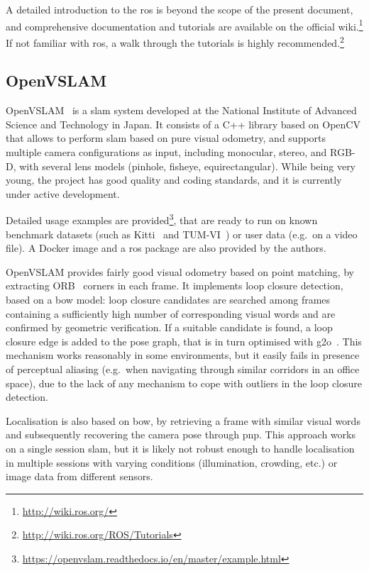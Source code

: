 \documentclass[11pt, letterpaper, twoside]{article}
\begin{document}
A detailed introduction to the \gls{ros} is beyond the scope of the present
document, and comprehensive documentation and tutorials are available on the
official wiki.\footnote{\url{http://wiki.ros.org/}} If not familiar with
\gls{ros}, a walk through the tutorials is highly
recommended.\footnote{\url{http://wiki.ros.org/ROS/Tutorials}}

\subsection{OpenVSLAM}

OpenVSLAM~\cite{openvslam2019} is a \gls{slam} system developed at the National
Institute of Advanced Science and Technology in Japan. It consists of a C++
library based on OpenCV that allows to perform \gls{slam} based on pure visual
odometry, and supports multiple camera configurations as input, including
monocular, stereo, and RGB-D, with several lens models (pinhole, fisheye,
equirectangular). While being very young, the project has good quality and
coding standards, and it is currently under active development.

Detailed usage examples are
provided\footnote{\url{https://openvslam.readthedocs.io/en/master/example.html}},
that are ready to run on known benchmark datasets (such as
Kitti~\cite{geiger2013vision} and TUM-VI~\cite{schubert2018vidataset}) or user
data (e.g.\ on a video file). A Docker image and a \gls{ros} package are also
provided by the authors.

OpenVSLAM provides fairly good visual odometry based on point matching, by
extracting ORB~\cite{rublee2011orb} corners in each frame. It implements loop
closure detection, based on a \gls{bow} model: loop closure candidates are
searched among frames containing a sufficiently high number of corresponding
visual words and are confirmed by geometric verification. If a suitable
candidate is found, a loop closure edge is added to the pose graph, that is in
turn optimised with g2o~\cite{grisetti2011g2o}. This mechanism works reasonably
in some environments, but it easily fails in presence of perceptual aliasing
(e.g.\ when navigating through similar corridors in an office space), due to
the lack of any mechanism to cope with outliers in the loop closure detection.

Localisation is also based on \gls{bow}, by retrieving a frame with similar
visual words and subsequently recovering the camera pose through \gls{pnp}.
This approach works on a single session \gls{slam}, but it is likely not robust
enough to handle localisation in multiple sessions with varying conditions
(illumination, crowding, etc.) or image data from different sensors.
\end{document}
